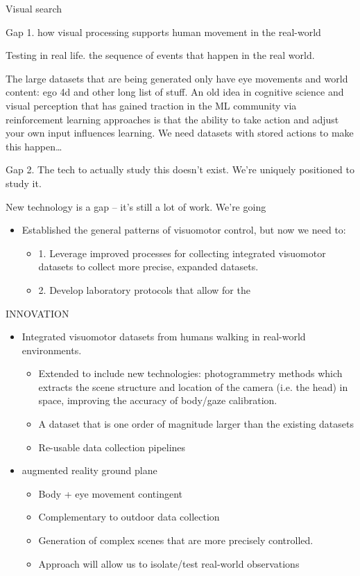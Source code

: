 \documentclass[
]{article}
\begin{document}
Visual search

Gap 1. how visual processing supports human movement in the real-world

Testing in real life. the sequence of events that happen in the real
world.

The large datasets that are being generated only have eye movements and
world content: ego 4d and other long list of stuff. An old idea in
cognitive science and visual perception that has gained traction in the
ML community via reinforcement learning approaches is that the ability
to take action and adjust your own input influences learning. We need
datasets with stored actions to make this happen\ldots{}

Gap 2. The tech to actually study this doesn't exist. We're uniquely
positioned to study it.

New technology is a gap -- it's still a lot of work. We're going

\begin{itemize}
\item
  Established the general patterns of visuomotor control, but now we
  need to:

  \begin{itemize}
  \item
    1. Leverage improved processes for collecting integrated visuomotor
    datasets to collect more precise, expanded datasets.
  \item
    2. Develop laboratory protocols that allow for the
  \end{itemize}
\end{itemize}

INNOVATION

\begin{itemize}
\item
  Integrated visuomotor datasets from humans walking in real-world
  environments.

  \begin{itemize}
  \item
    Extended to include new technologies: photogrammetry methods which
    extracts the scene structure and location of the camera (i.e. the
    head) in space, improving the accuracy of body/gaze calibration.
  \item
    A dataset that is one order of magnitude larger than the existing
    datasets
  \item
    Re-usable data collection pipelines
  \end{itemize}
\item
  augmented reality ground plane

  \begin{itemize}
  \item
    Body + eye movement contingent
  \item
    Complementary to outdoor data collection
  \item
    Generation of complex scenes that are more precisely controlled.
  \item
    Approach will allow us to isolate/test real-world observations
  \end{itemize}
\end{itemize}
\end{document}
